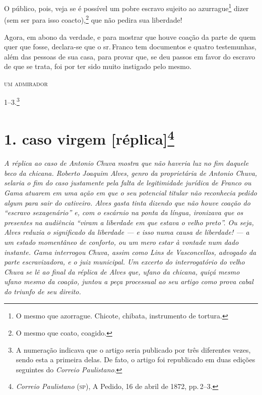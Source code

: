 O público, pois, veja se é possível um pobre escravo sujeito ao
azurrague\footnote{ O mesmo que azorrague. Chicote, chibata,
  instrumento de tortura.} dizer (sem ser para isso coacto),\footnote{
  O mesmo que coato, coagido.} que não pedira sua liberdade!

Agora, em abono da verdade, e para mostrar que houve coação da parte de
quem quer que fosse, declara-se que o sr.\,Franco tem documentos e quatro
testemunhas, além das pessoas de sua casa, para provar que, se deu
passos em favor do escravo de que se trata, foi por ter sido muito
instigado pelo mesmo.

\begin{flushright}
\textsc{um admirador}
\end{flushright}

1--3.\footnote{ A numeração indicava que o artigo seria publicado por
  três diferentes vezes, sendo esta a primeira delas. De fato, o artigo
  foi republicado em duas edições seguintes do \emph{Correio
  Paulistano}.}

\chapter{1. caso virgem {[}réplica{]}\footnote{\emph{Correio Paulistano} (\textsc{sp}), A Pedido, 16 de abril de 1872,
  pp.\,2--3.}} %

\begin{didascalia}
\emph{A réplica ao caso de Antonio Chuva mostra que não haveria luz no
fim daquele beco da chicana. Roberto Joaquim Alves, genro da
proprietária de Antonio Chuva, selaria o fim do caso justamente pela
falta de legitimidade jurídica de Franco ou Gama atuarem em uma ação em
que o seu potencial titular não reconhecia pedido algum para sair do
cativeiro. Alves gasta tinta dizendo que não houve coação do ``escravo
sexagenário'' e, com o escárnio na ponta da língua, ironizava que os
presentes na audiência ``viram a liberdade em que estava o velho preto''.
Ou seja, Alves reduzia o significado da liberdade --- e isso numa causa
de liberdade! --- a um estado momentâneo de conforto, ou um mero estar à
vontade num dado instante. Gama interrogou Chuva, assim como Lins de
Vasconcellos, advogado da parte escravizadora, e o juiz municipal. Um
excerto do interrogatório do velho Chuva se lê ao final da réplica de
Alves que, ufano da chicana, quiçá mesmo ufano mesmo da coação, juntou a
peça processual ao seu artigo como prova cabal do triunfo de seu
direito.}
\end{didascalia}


